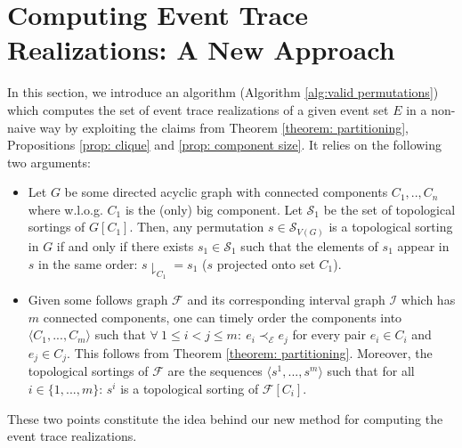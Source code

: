 \section{Computing Event Trace Realizations: A New Approach}
In this section, we introduce an algorithm (Algorithm \ref{alg:valid permutations}) which computes the set of event trace realizations of a given event set $E$ in a non-naive way by exploiting the claims from Theorem \ref{theorem: partitioning}, Propositions \ref{prop: clique} and \ref{prop: component size}.
It relies on the following two arguments:
\begin{itemize}
\item Let $G$ be some directed acyclic graph with connected components $C_1,..,C_n$ where w.l.o.g. $C_1$ is the (only) big component.
Let $\mathcal{S}_1$ be the set of topological sortings of $G[C_1]$.
Then, any permutation $s \in \mathcal{S}_{V(G)}$ is a topological sorting in $G$ if and only if there exists $s_1 \in \mathcal{S}_1$ such that the elements of $s_1$ appear in $s$ in the same order: $s \downharpoonright_{C_1} = s_1$ ($s$ projected onto set $C_1$).
\item Given some follows graph $\mathcal{F}$ and its corresponding interval graph $\mathcal{I}$ which has $m$ connected components, one can timely order the components into $\langle C_1,...,C_m \rangle$ such that $\forall ~ 1 \leq i<j \leq m: ~ e_i \prec_{\mathcal{E}} e_j$ for every pair $e_i \in C_i$ and $e_j \in C_j$.
This follows from Theorem \ref{theorem: partitioning}.
Moreover, the topological sortings of $\mathcal{F}$ are the sequences $\langle s^1,...,s^m \rangle$ such that for all $i \in \{1,...,m\}$: $s^i$ is a topological sorting of $\mathcal{F}[C_i]$.
\end{itemize}
These two points constitute the idea behind our new method for computing the event trace realizations.
